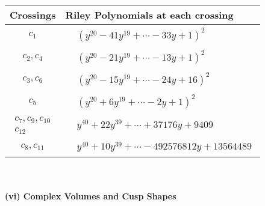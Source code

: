 \documentclass[1p]{elsarticle_modified}
\theoremstyle{definition}
\begin{document}
\begin{tabular}{m{50pt}|m{274pt}}
Crossings & \hspace{64pt}Riley Polynomials at each crossing \\
\hline $$\begin{aligned}c_{1}\end{aligned}$$&$\begin{aligned}
&(y^{20}-41 y^{19}+\cdots-33 y+1)^{2}
\end{aligned}$\\
\hline $$\begin{aligned}c_{2},c_{4}\end{aligned}$$&$\begin{aligned}
&(y^{20}-21 y^{19}+\cdots-13 y+1)^{2}
\end{aligned}$\\
\hline $$\begin{aligned}c_{3},c_{6}\end{aligned}$$&$\begin{aligned}
&(y^{20}-15 y^{19}+\cdots-24 y+16)^{2}
\end{aligned}$\\
\hline $$\begin{aligned}c_{5}\end{aligned}$$&$\begin{aligned}
&(y^{20}+6 y^{19}+\cdots-2 y+1)^{2}
\end{aligned}$\\
\hline $$\begin{aligned}c_{7},c_{9},c_{10}\\c_{12}\end{aligned}$$&$\begin{aligned}
&y^{40}+22 y^{39}+\cdots+37176 y+9409
\end{aligned}$\\
\hline $$\begin{aligned}c_{8},c_{11}\end{aligned}$$&$\begin{aligned}
&y^{40}+10 y^{39}+\cdots-492576812 y+13564489
\end{aligned}$\\
\hline
\end{tabular}\\~\\
\newpage\flushleft \textbf{(vi) Complex Volumes and Cusp Shapes}
\end{document}
